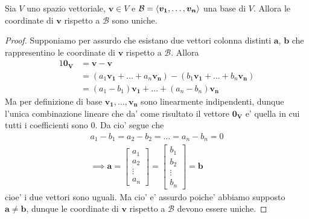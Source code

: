 \begin{proposition}
    Sia $V$ uno spazio vettoriale, $\bm{v} \in V$ e $\mathcal{B} = \left\langle \bm{v_1}, \dots, \bm{v_n} \right\rangle$ una base di $V$. Allora le coordinate di $\bm{v}$ rispetto a $\mathcal{B}$ sono uniche.
\end{proposition}
\begin{proof}
    Supponiamo per assurdo che esistano due vettori colonna distinti $\bm{a}$, $\bm{b}$ che rappresentino le coordinate di $\bm{v}$ rispetto a $\mathcal{B}$. Allora
    \begin{alignat*}
        {1}
        \bm{0_V}  &= \bm{v} - \bm{v} \\
                &= (a_1\bm{v_1} + \dots + a_n\bm{v_n}) - (b_1\bm{v_1} + \dots + b_n\bm{v_n}) \\
                &= (a_1 - b_1)\bm{v_1} + \dots + (a_n - b_n)\bm{v_n}
    \end{alignat*}
    Ma per definizione di base $\bm{v_1}, \dots, \bm{v_n}$ sono linearmente indipendenti, dunque l'unica combinazione lineare che da' come risultato il vettore $\bm{0_V}$ e' quella in cui tutti i coefficienti sono $0$. Da cio' segue che
    \begin{gather*}
        a_1 - b_1 = a_2 - b_2 = \dots = a_n - b_n = 0 \\
        \implies \bm{a} = \begin{bmatrix}
            a_1 \\
            a_2 \\
            \vdots \\
            a_n
        \end{bmatrix}
        = 
        \begin{bmatrix}
            b_1 \\
            b_2 \\
            \vdots \\
            b_n
        \end{bmatrix} = \bm{b}
    \end{gather*}
    cioe' i due vettori sono uguali. Ma cio' e' assurdo poiche' abbiamo supposto $\bm{a} \neq \bm{b}$, dunque le coordinate di $\bm{v}$ rispetto a $\mathcal{B}$ devono essere uniche.
\end{proof}

